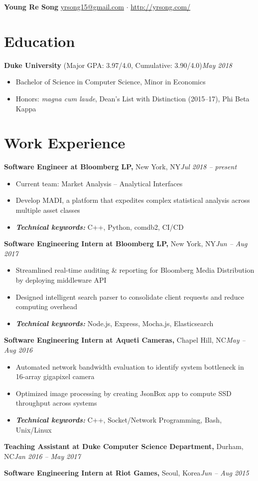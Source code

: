 \documentclass[11pt,letterpaper]{article}
\newcommand{\entry}[3]{\textbf{#1}#2\hfill\textit{#3}\par}
\newcommand{\kw}[1]{\textbf{\textit{#1}}}
\begin{document}
{\LARGE\bfseries Young Re Song}\hfill
\href{mailto:yrsong15@gmail.com}{yrsong15@gmail.com} $\cdot$ \href{http://yrsong.com/}{http://yrsong.com/}

\section*{Education}
\entry{Duke University }{(Major GPA: 3.97/4.0, Cumulative: 3.90/4.0)}{May 2018}
\begin{itemize}
  \item Bachelor of Science in Computer Science, Minor in Economics
  \item Honors: \textit{magna cum laude}, Dean's List with Distinction (2015--17), Phi Beta Kappa
\end{itemize}

\section*{Work Experience}
\entry{Software Engineer at Bloomberg LP,}{ New York, NY}{Jul 2018 -- present}
\begin{itemize}
  \item Current team: Market Analysis -- Analytical Interfaces
  \item Develop MADI, a platform that expedites complex statistical analysis across multiple asset classes
  \item \kw{Technical keywords:} C++, Python, comdb2, CI/CD
\end{itemize}
\entry{Software Engineering Intern at Bloomberg LP,}{ New York, NY}{Jun -- Aug 2017}
\begin{itemize}
  \item Streamlined real-time auditing \& reporting for Bloomberg Media Distribution by deploying middleware API
  \item Designed intelligent search parser to consolidate client requests and reduce computing overhead
  \item \kw{Technical keywords:} Node.js, Express, Mocha.js, Elasticsearch
\end{itemize}
\entry{Software Engineering Intern at Aqueti Cameras,}{ Chapel Hill, NC}{May -- Aug 2016}
\begin{itemize}
  \item Automated network bandwidth evaluation to identify system bottleneck in 16-array gigapixel camera
  \item Optimized image processing by creating JsonBox app to compute SSD throughput across systems
  \item \kw{Technical keywords:} C++, Socket/Network Programming, Bash, Unix/Linux
\end{itemize}
\entry{Teaching Assistant at Duke Computer Science Department,}{ Durham, NC}{Jan 2016 -- May 2017}
\entry{Software Engineering Intern at Riot Games,}{ Seoul, Korea}{Jun -- Aug 2015}
\end{document}
